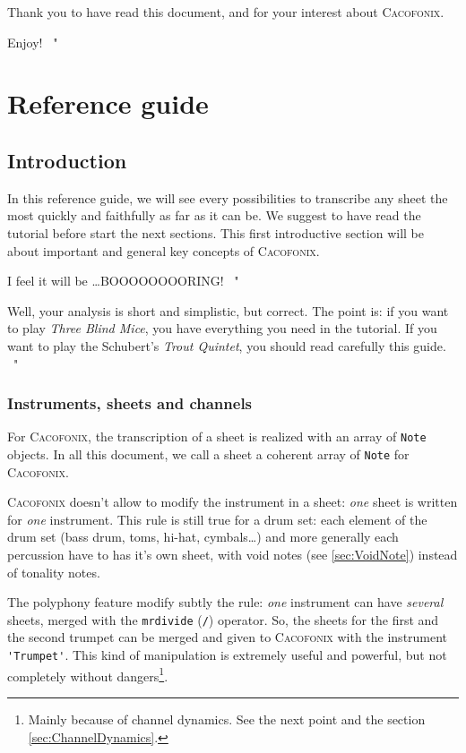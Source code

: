 \documentclass{article}
\newcommand\cacofonix{\textsc{Cacofonix}\xspace}
\newenvironment{meenv}{ \par \noindent \makebox[6em][r]{ \textcolor{mecolor}{Me}: " --~}}{~"}
\newenvironment{myselfenv}{ \par \noindent \makebox[6em][r]{ \textcolor{myselfcolor}{Myself}: " --~}}{~"}
\newcommand{ \me }[1]{%
\begin{meenv}%
	#1%
\end{meenv} }
\newcommand{ \myself }[1]{%
\begin{myselfenv}%
	#1%
\end{myselfenv} }
\begin{document}
Thank you to have read this document, and for your interest about \cacofonix.

\myself{Enjoy!}

\section{Reference guide}

\subsection{Introduction}

In this reference guide, we will see every possibilities to transcribe any sheet the most quickly and faithfully as far as it can be. We suggest to have read the tutorial before start the next sections. This first introductive section will be about important and general key concepts of \cacofonix.

\me{I feel it will be \dots \textsc{BOOOOOOOORING}!}
\myself{Well, your analysis is short and simplistic, but correct. The point is: if you want to play \emph{Three Blind Mice}, you have everything you need in the tutorial. If you want to play the Schubert's \emph{Trout Quintet}, you should read carefully this guide.}

\subsubsection{Instruments, sheets and channels}

For \cacofonix, the transcription of a sheet is realized with an array of \lstinline!Note! objects. In all this document, we call a sheet a coherent array of \lstinline!Note! for \cacofonix.

\cacofonix doesn't allow to modify the instrument in a sheet: \emph{one} sheet is written for \emph{one} instrument. This rule is still true for a drum set: each element of the drum set (bass drum, toms, hi-hat, cymbals\dots) and more generally each percussion have to has it's own sheet, with void notes (see \ref{sec:VoidNote}) instead of tonality notes.

The polyphony feature modify subtly the rule: \emph{one} instrument can have \emph{several} sheets, merged with the \lstinline!mrdivide! (\lstinline!/!) operator. So, the sheets for the first and the second trumpet can be merged and given to \cacofonix with the instrument \lstinline!'Trumpet'!. This kind of manipulation is extremely useful and powerful, but not completely without dangers\footnote{Mainly because of channel dynamics. See the next point and the section \ref{sec:ChannelDynamics}.}.
\end{document}
